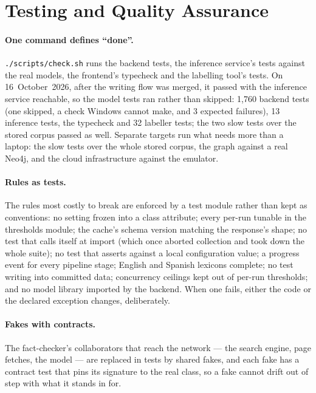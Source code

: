 
\section{Testing and Quality Assurance}
\label{sec:dev-testing}

\paragraph{One command defines ``done''.} \texttt{./scripts/check.sh}
runs the backend tests, the inference service's tests against the real
models, the frontend's typecheck and the labelling tool's tests. On
16~October~2026, after the writing flow was merged, it passed with the
inference service reachable, so the model tests ran rather than
skipped: 1,760 backend tests (one skipped, a check Windows cannot make,
and 3 expected failures), 13 inference tests, the typecheck and 32
labeller tests; the two slow tests over the stored corpus passed as
well. Separate targets run what
needs more than a laptop: the slow tests over the whole stored corpus,
the graph against a real Neo4j, and the cloud infrastructure against
the emulator.

\paragraph{Rules as tests.} The rules most costly to break are enforced
by a test module rather than kept as conventions: no setting frozen
into a class attribute; every per-run tunable in the thresholds module;
the cache's schema version matching the response's shape; no test that
calls itself at import (which once aborted collection and took down the
whole suite); no test that asserts against a local configuration value;
a progress event for every pipeline stage; English and Spanish lexicons
complete; no test writing into committed data; concurrency ceilings
kept out of per-run thresholds; and no model library imported by the
backend. When one fails, either the code or the declared exception
changes, deliberately.

\paragraph{Fakes with contracts.} The fact-checker's collaborators that
reach the network --- the search engine, page fetches, the model --- are
replaced in tests by shared fakes, and each fake has a contract test
that pins its signature to the real class, so a fake cannot drift out of
step with what it stands in for.

